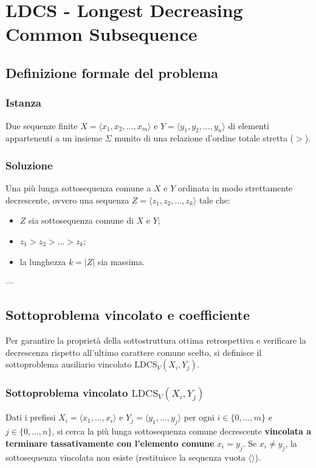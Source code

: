 \chapter{LDCS - Longest Decreasing Common Subsequence}

\section{Definizione formale del problema}

\subsection{Istanza}
Due sequenze finite $X = \langle x_1, x_2, \dots, x_m \rangle$ e $Y = \langle y_1, y_2, \dots, y_n \rangle$ di elementi appartenenti a un insieme $\Sigma$ munito di una relazione d'ordine totale stretta ($>$).

\subsection{Soluzione}
Una più lunga sottosequenza comune a $X$ e $Y$ ordinata in modo strettamente decrescente, ovvero una sequenza $Z = \langle z_1, z_2, \dots, z_k \rangle$ tale che:
\begin{itemize}
    \item $Z$ sia sottosequenza comune di $X$ e $Y$;
    \item $z_1 > z_2 > \dots > z_k$;
    \item la lunghezza $k = |Z|$ sia massima.
\end{itemize}

---

\section{Sottoproblema vincolato e coefficiente}

Per garantire la proprietà della sottostruttura ottima retrospettiva e verificare la decrescenza rispetto all'ultimo carattere comune scelto, si definisce il sottoproblema ausiliario vincolato $\text{LDCS}_V(X_i, Y_j)$.

\subsection{Sottoproblema vincolato $\text{LDCS}_V(X_i, Y_j)$}
Dati i prefissi $X_i = \langle x_1, \dots, x_i \rangle$ e $Y_j = \langle y_1, \dots, y_j \rangle$ per ogni $i \in \{0, \dots, m\}$ e $j \in \{0, \dots, n\}$, si cerca la più lunga sottosequenza comune decrescente \textbf{vincolata a terminare tassativamente con l'elemento comune} $x_i = y_j$. Se $x_i \neq y_j$, la sottosequenza vincolata non esiste (restituisce la sequenza vuota $\langle \rangle$).

